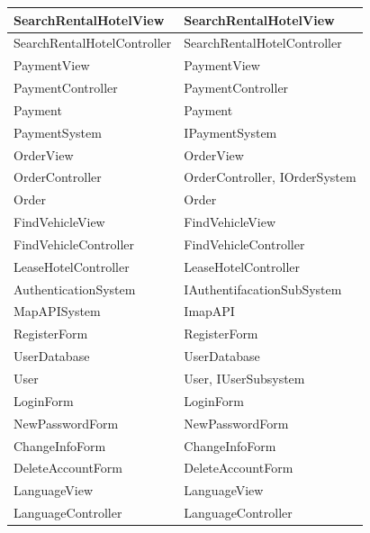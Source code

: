 \begin{longtable}{|p{6cm}|p{9cm}|}
\hline
SearchRentalHotelView & SearchRentalHotelView \\
\hline
SearchRentalHotelController & SearchRentalHotelController \\
\hline
PaymentView & PaymentView \\
\hline
PaymentController & PaymentController \\
\hline
Payment & Payment \\
\hline
PaymentSystem & IPaymentSystem \\
\hline
OrderView & OrderView \\
\hline
OrderController & OrderController, IOrderSystem \\
\hline
Order & Order \\
\hline
FindVehicleView & FindVehicleView \\
\hline
FindVehicleController & FindVehicleController \\
\hline
LeaseHotelController & LeaseHotelController \\
\hline
AuthenticationSystem & IAuthentifacationSubSystem\\
\hline
MapAPISystem & ImapAPI \\
\hline
RegisterForm & RegisterForm \\
\hline
UserDatabase & UserDatabase \\
\hline
User & User, IUserSubsystem \\
\hline
LoginForm & LoginForm \\
\hline
NewPasswordForm & NewPasswordForm \\
\hline
ChangeInfoForm & ChangeInfoForm \\
\hline
DeleteAccountForm &DeleteAccountForm \\
\hline
LanguageView & LanguageView \\
\hline
LanguageController & LanguageController \\
\hline
\end{longtable}

